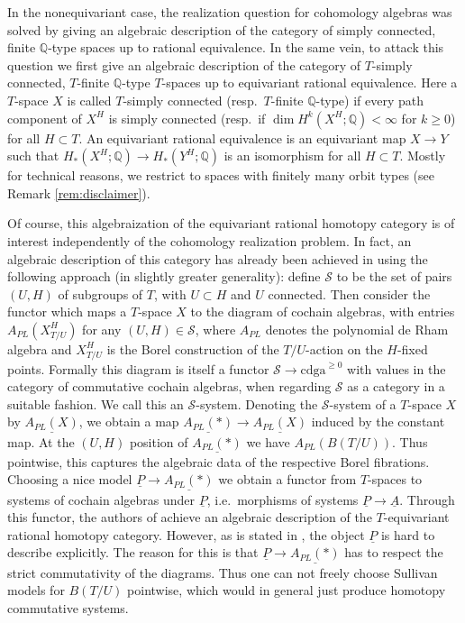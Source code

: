 \documentclass[12pt,a4paper]{article}
\theoremstyle{definition}
\begin{document}
In the nonequivariant case, the realization question for cohomology algebras was solved by giving an algebraic description of the category of simply connected, finite $\mathbb{Q}$-type spaces up to rational equivalence. In the same vein, to attack this question we first give an algebraic description of the category of $T$-simply connected, $T$-finite $\mathbb{Q}$-type $T$-spaces up to equivariant rational equivalence. Here a $T$-space $X$ is called $T$-simply connected (resp.\ $T$-finite $\mathbb{Q}$-type) if every path component of $X^H$ is simply connected (resp.\ if $\dim H^k(X^H;\mathbb{Q})<\infty$ for $k\geq 0$) for all $H\subset T$. An equivariant rational equivalence is an equivariant map $X\rightarrow Y$ such that $H_*(X^H;\mathbb{Q})\rightarrow H_*(Y^H;\mathbb{Q})$ is an isomorphism for all $H\subset T$. Mostly for technical reasons, we restrict to spaces with finitely many orbit types (see Remark \ref{rem:disclaimer}).

Of course, this algebraization of the equivariant rational homotopy category is of interest independently of the cohomology realization problem. In fact, an algebraic description of this category has already been achieved in \cite{ScullMendes} using the following approach (in slightly greater generality): define $\mathcal{S}$ to be the set of pairs $(U,H)$ of subgroups of $T$, with $U\subset H$ and $U$ connected. Then consider the functor which maps a $T$-space $X$ to the diagram of cochain algebras, with entries $A_{PL}(X^H_{T/U})$ for any $(U,H)\in\mathcal{S}$, where $A_{PL}$ denotes the polynomial de Rham algebra and $X_{T/U}^H$ is the Borel construction of the $T/U$-action on the $H$-fixed points.
Formally this diagram is itself a functor $\mathcal{S}\rightarrow \mathrm{cdga}^{\geq 0}$ with values in the category of commutative cochain algebras, when regarding $\mathcal{S}$ as a category in a suitable fashion. We call this an $\mathcal{S}$-system. Denoting the $\mathcal{S}$-system of a $T$-space $X$ by $\underline{A_{PL}(X)}$, we obtain a map $\underline{A_{PL}(*)}\rightarrow \underline{A_{PL}(X)}$ induced by the constant map. At the $(U,H)$ position of $\underline{A_{PL}(*)}$  we have $A_{PL}(B(T/U))$. Thus pointwise, this captures the algebraic data of the respective Borel fibrations. Choosing a nice model $\underline{P}\rightarrow \underline {A_{PL}(*)}$ we obtain a functor from $T$-spaces to systems of cochain algebras under $\underline{P}$, i.e.\ morphisms of systems $\underline{P}\rightarrow \underline{A}$. Through this functor, the authors of \cite{ScullMendes} achieve an algebraic description of the $T$-equivariant rational homotopy category. However, as is stated in \cite{ScullMendes}, the object $\underline{P}$ is hard to describe explicitly.
The reason for this is that $\underline{P}\rightarrow \underline{A_{PL}(*)}$ has to respect the strict commutativity of the diagrams. Thus one can not freely choose Sullivan models for $B(T/U)$ pointwise, which would in general just produce homotopy commutative systems.
\end{document}
